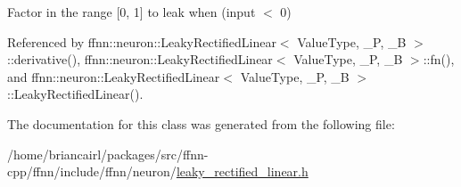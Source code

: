 Factor in the range \mbox{[}0, 1\mbox{]} to leak when (input $<$ 0) 



Referenced by ffnn\-::neuron\-::\-Leaky\-Rectified\-Linear$<$ Value\-Type, \-\_\-\-P, \-\_\-\-B $>$\-::derivative(), ffnn\-::neuron\-::\-Leaky\-Rectified\-Linear$<$ Value\-Type, \-\_\-\-P, \-\_\-\-B $>$\-::fn(), and ffnn\-::neuron\-::\-Leaky\-Rectified\-Linear$<$ Value\-Type, \-\_\-\-P, \-\_\-\-B $>$\-::\-Leaky\-Rectified\-Linear().



The documentation for this class was generated from the following file\-:\begin{DoxyCompactItemize}
\item 
/home/briancairl/packages/src/ffnn-\/cpp/ffnn/include/ffnn/neuron/\hyperlink{leaky__rectified__linear_8h}{leaky\-\_\-rectified\-\_\-linear.\-h}\end{DoxyCompactItemize}
